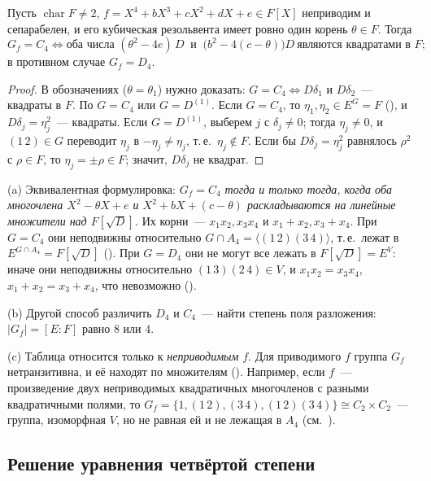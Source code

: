 \begin{theorem}
Пусть $\operatorname{char}F\ne2$, $f=X^4+bX^3+cX^2+dX+e\in F[X]$ неприводим и сепарабелен, и его кубическая резольвента имеет
ровно один корень $\theta\in F$. Тогда
\[
G_f=C_4\iff\text{оба числа }(\theta^2-4e)\,D\ \text{ и }\ \bigl(b^2-4(c-\theta)\bigr)D\ \text{являются квадратами в }F;
\]
в противном случае $G_f=D_4$.
\end{theorem}

\begin{proof}
В обозначениях  ($\theta=\theta_1$) нужно доказать: $G=C_4\iff D\delta_1$ и $D\delta_2$~--- квадраты в $F$. По  $G=C_4$ или
$G=D^{(1)}$. Если $G=C_4$, то $\eta_1,\eta_2\in E^G=F$ (), и $D\delta_j=\eta_j^2$~--- квадраты. Если $G=D^{(1)}$, выберем $j$ с $\delta_j\ne0$;
тогда $\eta_j\ne0$, и $(1\,2)\in G$ переводит $\eta_j$ в $-\eta_j\ne\eta_j$, т.\,е.\ $\eta_j\notin F$. Если бы $D\delta_j=\eta_j^2$ равнялось $\rho^2$ с
$\rho\in F$, то $\eta_j=\pm\rho\in F$; значит, $D\delta_j$ не квадрат.
\end{proof}

\begin{remark}[4.9g]
(a) Эквивалентная формулировка: \emph{$G_f=C_4$ тогда и только тогда, когда оба многочлена $X^2-\theta X+e$ и
$X^2+bX+(c-\theta)$ раскладываются на линейные множители над $F[\sqrt D]$.} Их корни~--- $x_1x_2,x_3x_4$ и $x_1+x_2,x_3+x_4$. При
$G=C_4$ они неподвижны относительно $G\cap A_4=\langle(1\,2)(3\,4)\rangle$, т.\,е.\ лежат в $E^{G\cap A_4}=F[\sqrt D]$ (). При $G=D_4$ они
не могут все лежать в $F[\sqrt D]=E^V$: иначе они неподвижны относительно $(1\,3)(2\,4)\in V$, и $x_1x_2=x_3x_4$, $x_1+x_2=x_3+x_4$,
что невозможно ().

(b) Другой способ различить $D_4$ и $C_4$~--- найти степень поля разложения: $|G_f|=[E:F]$ равно $8$ или $4$.

(c) Таблица  относится только к \emph{неприводимым} $f$. Для приводимого $f$ группа $G_f$ нетранзитивна, и её находят по
множителям (). Например, если $f$~--- произведение двух неприводимых квадратичных многочленов с разными
квадратичными полями, то $G_f=\{1,(1\,2),(3\,4),(1\,2)(3\,4)\}\cong C_2\times C_2$~--- группа, изоморфная $V$, но не равная ей и не
лежащая в $A_4$ (см.\ ).
\end{remark}

\subsection*{Решение уравнения четвёртой степени}

